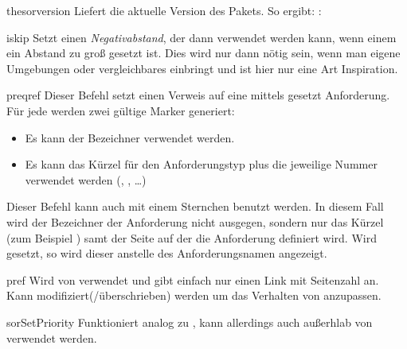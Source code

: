 \documentclass{sopra-base}
\begin{document}
\begin{command}{thesorversion}{}
    Liefert die aktuelle Version des Pakets. So ergibt: : \thesorversion\\
\end{command}

\begin{command}{iskip}{}
    Setzt einen \emph{Negativabstand}, der dann verwendet werden kann, wenn einem ein Abstand zu groß gesetzt ist. Dies wird nur dann nötig sein, wenn man eigene Umgebungen oder vergleichbares einbringt und ist hier nur eine Art Inspiration.
\end{command}

\begin{command}{preqref}{}
    Dieser Befehl setzt einen Verweis auf eine mittels  gesetzt Anforderung. Für jede werden zwei gültige Marker generiert: \begin{itemize}\setlength{\itemsep}{0pt}
        \item Es kann der Bezeichner verwendet werden.
        \item Es kann das Kürzel für den Anforderungstyp plus die jeweilige Nummer verwendet werden (, , \ldots)
    \end{itemize}
    Dieser Befehl kann auch mit einem Sternchen benutzt werden. In diesem Fall wird der
    Bezeichner der Anforderung nicht ausgegen, sondern nur das Kürzel (zum Beispiel ) samt der Seite auf der die Anforderung definiert wird. Wird  gesetzt, so wird
    dieser anstelle des Anforderungsnamen angezeigt.
\end{command}

\begin{command}{pref}{}
    Wird von  verwendet und gibt einfach nur einen Link mit Seitenzahl an.
    Kann modifiziert(/überschrieben) werden um das Verhalten von  anzupassen.
\end{command}

\begin{command}{sorSetPriority}{}
    Funktioniert analog zu , kann allerdings auch außerhlab von  verwendet werden.
\end{command}
\end{document}
